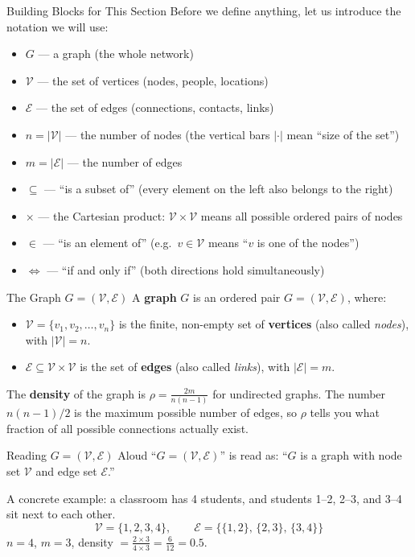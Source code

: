 \begin{conceptbox}{Building Blocks for This Section}
Before we define anything, let us introduce the notation we will use:
\begin{itemize}[noitemsep]
    \item $G$ --- a graph (the whole network)
    \item $\mathcal{V}$ --- the set of vertices (nodes, people, locations)
    \item $\mathcal{E}$ --- the set of edges (connections, contacts, links)
    \item $n = |\mathcal{V}|$ --- the number of nodes (the vertical bars $|\cdot|$ mean ``size of the set'')
    \item $m = |\mathcal{E}|$ --- the number of edges
    \item $\subseteq$ --- ``is a subset of'' (every element on the left also belongs to the right)
    \item $\times$ --- the Cartesian product: $\mathcal{V} \times \mathcal{V}$ means all possible ordered pairs of nodes
    \item $\in$ --- ``is an element of'' (e.g.\ $v \in \mathcal{V}$ means ``$v$ is one of the nodes'')
    \item $\iff$ --- ``if and only if'' (both directions hold simultaneously)
\end{itemize}
\end{conceptbox}

\begin{conceptbox}{The Graph $G = (\mathcal{V}, \mathcal{E})$}
A \textbf{graph} $G$ is an ordered pair $G = (\mathcal{V}, \mathcal{E})$, where:
\begin{itemize}[noitemsep]
    \item $\mathcal{V} = \{v_1, v_2, \dots, v_n\}$ is the finite, non-empty set of \textbf{vertices} (also called \textit{nodes}), with $|\mathcal{V}| = n$.
    \item $\mathcal{E} \subseteq \mathcal{V} \times \mathcal{V}$ is the set of \textbf{edges} (also called \textit{links}), with $|\mathcal{E}| = m$.
\end{itemize}
The \textbf{density} of the graph is $\rho = \frac{2m}{n(n-1)}$ for undirected graphs. The number $n(n-1)/2$ is the maximum possible number of edges, so $\rho$ tells you what fraction of all possible connections actually exist.
\end{conceptbox}

\begin{examplebox}{Reading $G = (\mathcal{V}, \mathcal{E})$ Aloud}
``$G = (\mathcal{V}, \mathcal{E})$'' is read as: ``$G$ is a graph with node set $\mathcal{V}$ and edge set $\mathcal{E}$.''

A concrete example: a classroom has 4 students, and students 1--2, 2--3, and 3--4 sit next to each other.
\[
\mathcal{V} = \{1, 2, 3, 4\}, \qquad \mathcal{E} = \{\{1,2\},\, \{2,3\},\, \{3,4\}\}
\]
$n = 4$, $m = 3$, density $= \frac{2 \times 3}{4 \times 3} = \frac{6}{12} = 0.5$.
\end{examplebox}

